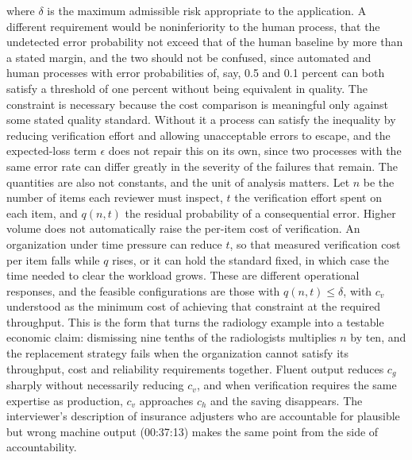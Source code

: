 \documentclass[12pt]{article}
\newcommand{\ts}[1]{(#1)}
\begin{document}
where $\delta$ is the maximum admissible risk appropriate to the application. A different requirement would be noninferiority to the human process, that the undetected error probability not exceed that of the human baseline by more than a stated margin, and the two should not be confused, since automated and human processes with error probabilities of, say, 0.5 and 0.1 percent can both satisfy a threshold of one percent without being equivalent in quality. The constraint is necessary because the cost comparison is meaningful only against some stated quality standard. Without it a process can satisfy the inequality by reducing verification effort and allowing unacceptable errors to escape, and the expected-loss term $\epsilon$ does not repair this on its own, since two processes with the same error rate can differ greatly in the severity of the failures that remain. The quantities are also not constants, and the unit of analysis matters. Let $n$ be the number of items each reviewer must inspect, $t$ the verification effort spent on each item, and $q(n,t)$ the residual probability of a consequential error. Higher volume does not automatically raise the per-item cost of verification. An organization under time pressure can reduce $t$, so that measured verification cost per item falls while $q$ rises, or it can hold the standard fixed, in which case the time needed to clear the workload grows. These are different operational responses, and the feasible configurations are those with $q(n,t) \leq \delta$, with $c_v$ understood as the minimum cost of achieving that constraint at the required throughput. This is the form that turns the radiology example into a testable economic claim: dismissing nine tenths of the radiologists multiplies $n$ by ten, and the replacement strategy fails when the organization cannot satisfy its throughput, cost and reliability requirements together. Fluent output reduces $c_g$ sharply without necessarily reducing $c_v$, and when verification requires the same expertise as production, $c_v$ approaches $c_h$ and the saving disappears. The interviewer's description of insurance adjusters who are accountable for plausible but wrong machine output \ts{00:37:13} makes the same point from the side of accountability.
\end{document}
